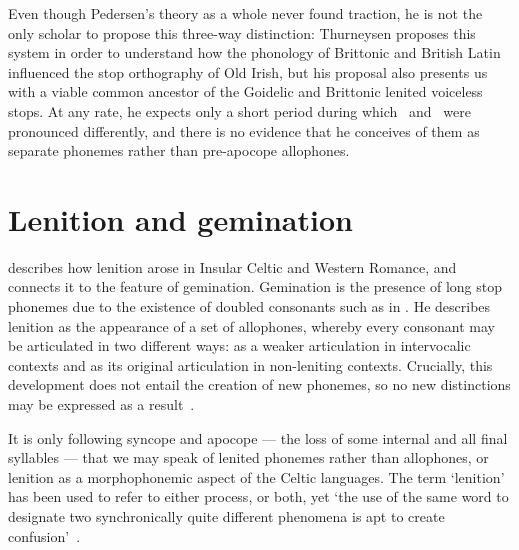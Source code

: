 Even though Pedersen's theory as a whole never found traction, he is not the only scholar to propose this three-way distinction:
Thurneysen proposes this system in order to understand how the phonology of Brittonic and British Latin influenced the stop orthography of Old Irish, but his proposal also presents us with a viable common ancestor of the Goidelic and Brittonic lenited voiceless stops. At any rate, he expects only a short period during which \lT\ and \xD\ were pronounced differently, and there is no evidence that he conceives of them as separate phonemes rather than pre-apocope allophones.

\section{Lenition and gemination}
\label{sec:martinet}

\Textcite{martinet_celtic_1952} describes how lenition arose in Insular Celtic and Western Romance, and connects it to the feature of gemination. Gemination is the presence of long stop phonemes due to the existence of doubled consonants such as  in . He describes lenition as the appearance of a set of allophones, whereby every consonant may be articulated in two different ways: as a weaker articulation in intervocalic contexts and as its original articulation in non-leniting contexts. Crucially, this development does not entail the creation of new phonemes, so no new distinctions may be expressed as a result~\autocite[192]{martinet_celtic_1952}.

It is only following syncope and apocope — the loss of some internal and all final syllables — that we may speak of lenited phonemes rather than allophones, or lenition as a morphophonemic aspect of the Celtic languages. The term `lenition' has been used to refer to either process, or both, yet `the use of the same word to designate two synchronically quite different phenomena is apt to create confusion'~\autocite[193–194]{martinet_celtic_1952}.


